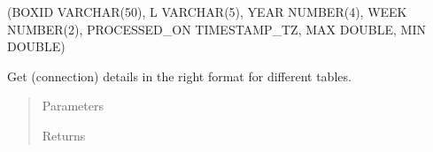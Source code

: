 \documentclass[letterpaper,10pt,english]{sphinxmanual}
\begin{document}

\begin{fulllineitems}
\label{\detokenize{autoapi/src/utils/snowflake/index:src.utils.snowflake.channel_like}}
\end{fulllineitems}


\begin{fulllineitems}
\label{\detokenize{autoapi/src/utils/snowflake/index:src.utils.snowflake.column_details}}
\end{fulllineitems}


(BOXID VARCHAR(50), L VARCHAR(5),
YEAR NUMBER(4), WEEK NUMBER(2),
PROCESSED\_ON TIMESTAMP\_TZ,
MAX DOUBLE, MIN DOUBLE)

\begin{fulllineitems}
\label{\detokenize{autoapi/src/utils/snowflake/index:src.utils.snowflake.format_connection}}
Get (connection) details in the right format for different tables.
\begin{quote}\begin{description}
\item[{Parameters}] \leavevmode\begin{description}
\item[{}] \leavevmode{[}    \sphinxcode{\sphinxupquote{sources}}{]}
\end{description}

\item[{Returns}] \leavevmode\begin{description}
\item[{}] \leavevmode
\end{description}

\end{description}\end{quote}

\end{fulllineitems}
\end{document}
